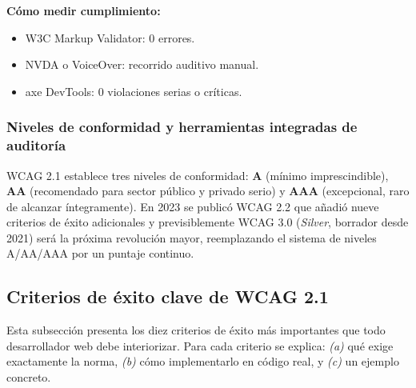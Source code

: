 \documentclass[11pt,a4paper,openany]{book}
\begin{document}
\textbf{Cómo medir cumplimiento:}
\begin{itemize}
\item W3C Markup Validator: 0 errores.
\item NVDA o VoiceOver: recorrido auditivo manual.
\item axe DevTools: 0 violaciones serias o críticas.
\end{itemize}

\subsubsection{Niveles de conformidad y herramientas integradas de auditoría}

WCAG 2.1 establece tres niveles de conformidad: \textbf{A} (mínimo
imprescindible), \textbf{AA} (recomendado para sector público y
privado serio) y \textbf{AAA} (excepcional, raro de alcanzar
íntegramente). En 2023 se publicó WCAG 2.2 que añadió nueve criterios
de éxito adicionales y previsiblemente WCAG 3.0 (\emph{Silver},
borrador desde 2021) será la próxima revolución mayor, reemplazando
el sistema de niveles A/AA/AAA por un puntaje continuo.

\subsection{Criterios de éxito clave de WCAG 2.1}

Esta subsección presenta los diez criterios de éxito más importantes
que todo desarrollador web debe interiorizar. Para cada criterio se
explica: \emph{(a)} qué exige exactamente la norma, \emph{(b)} cómo
implementarlo en código real, y \emph{(c)} un ejemplo concreto.
\end{document}
